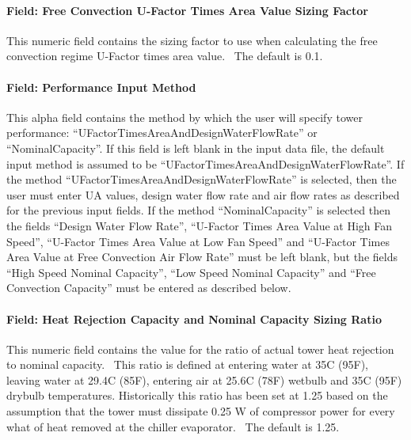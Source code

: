 \paragraph{Field: Free Convection U-Factor Times Area Value Sizing Factor}\label{field-free-convection-u-factor-times-area-value-sizing-factor-1}

This numeric field contains the sizing factor to use when calculating the free convection regime U-Factor times area value.~ The default is 0.1.

\paragraph{Field: Performance Input Method}\label{field-performance-input-method-1}

This alpha field contains the method by which the user will specify tower performance: ``UFactorTimesAreaAndDesignWaterFlowRate'' or ``NominalCapacity''. If this field is left blank in the input data file, the default input method is assumed to be ``UFactorTimesAreaAndDesignWaterFlowRate''. If the method ``UFactorTimesAreaAndDesignWaterFlowRate'' is selected, then the user must enter UA values, design water flow rate and air flow rates as described for the previous input fields. If the method ``NominalCapacity'' is selected then the fields ``Design Water Flow Rate'', ``U-Factor Times Area Value at High Fan Speed'', ``U-Factor Times Area Value at Low Fan Speed'' and ``U-Factor Times Area Value at Free Convection Air Flow Rate'' must be left blank, but the fields ``High Speed Nominal Capacity'', ``Low Speed Nominal Capacity'' and ``Free Convection Capacity'' must be entered as described below.

\paragraph{Field: Heat Rejection Capacity and Nominal Capacity Sizing Ratio}\label{field-heat-rejection-capacity-and-nominal-capacity-sizing-ratio-1}

This numeric field contains the value for the ratio of actual tower heat rejection to nominal capacity.~ This ratio is defined at entering water at 35C (95F), leaving water at 29.4C (85F), entering air at 25.6C (78F) wetbulb and 35C (95F) drybulb temperatures. Historically this ratio has been set at 1.25 based on the assumption that the tower must dissipate 0.25 W of compressor power for every what of heat removed at the chiller evaporator.~ The default is 1.25.

